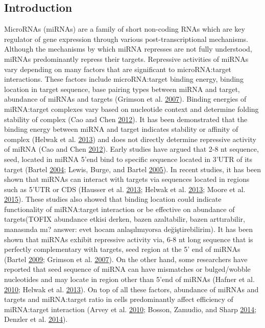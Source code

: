\documentclass[]{article}
\begin{document}
\hypertarget{introduction}{%
\subsection{Introduction}\label{introduction}}

MicroRNAs (miRNAs) are a family of short non-coding RNAs which are key
regulator of gene expression through various post-transcriptional
mechanisms. Although the mechanisms by which miRNA represses are not
fully understood, miRNAs predominantly repress their targets. Repressive
activities of miRNAs vary depending on many factors that are significant
to microRNA:target interactions. These factors include microRNA:target
binding energy, binding location in target sequence, base pairing types
between miRNA and target, abundance of miRNAs and targets (Grimson et
al. \protect\hyperlink{ref-grimson_microrna_2007}{2007}). Binding
energies of miRNA:target complexes vary based on nucleotide context and
determine folding stability of complex (Cao and Chen
\protect\hyperlink{ref-cao_predicting_2012}{2012}). It has been
demonstrated that the binding energy between miRNA and target indicates
stability or affinity of complex (Helwak et al.
\protect\hyperlink{ref-helwak_mapping_2013}{2013}) and does not directly
determine repressive activity of miRNA (Cao and Chen
\protect\hyperlink{ref-cao_predicting_2012}{2012}). Early studies have
argued that 2-8 nt sequence, seed, located in miRNA 5'end bind to
specific sequence located in 3'UTR of its target (Bartel
\protect\hyperlink{ref-bartel_micrornas_2004}{2004}; Lewis, Burge, and
Bartel \protect\hyperlink{ref-lewis_conserved_2005}{2005}). In recent
studies, it has been shown that miRNAs can interact with targets via
sequences located in regions such as 5'UTR or CDS (Hausser et al.
\protect\hyperlink{ref-hausser_analysis_2013}{2013}; Helwak et al.
\protect\hyperlink{ref-helwak_mapping_2013}{2013}; Moore et al.
\protect\hyperlink{ref-moore_mirnatarget_2015}{2015}). These studies
also showed that binding location could indicate functionality of
miRNA:target interaction or be effective on abundance of targets(TOFIX
abundance etkisi derken, bazen azaltabilir, bazen arttırabilir,
manasında mı? answer: evet hocam anlaşılmıyorsa değiştirebilirim). It
has been shown that miRNAs exhibit repressive activity via, 6-8 nt long
sequence that is perfectly complementary with targets, seed region at
the 5' end of miRNAs (Bartel
\protect\hyperlink{ref-bartel_micrornas:_2009}{2009}; Grimson et al.
\protect\hyperlink{ref-grimson_microrna_2007}{2007}). On the other hand,
some researchers have reported that seed sequence of miRNA can have
mismatches or bulged/wobble nucleotides and may locate in region other
than 5'end of miRNAs (Hafner et al.
\protect\hyperlink{ref-hafner_transcriptome-wide_2010}{2010}; Helwak et
al. \protect\hyperlink{ref-helwak_mapping_2013}{2013}). On top of all
these factors, abundance of miRNAs and targets and miRNA:target ratio in
cells predominantly affect efficiency of miRNA:target interaction (Arvey
et al. \protect\hyperlink{ref-arvey_target_2010}{2010}; Bosson, Zamudio,
and Sharp \protect\hyperlink{ref-bosson_endogenous_2014}{2014}; Denzler
et al. \protect\hyperlink{ref-denzler_assessing_2014}{2014}).
\end{document}
